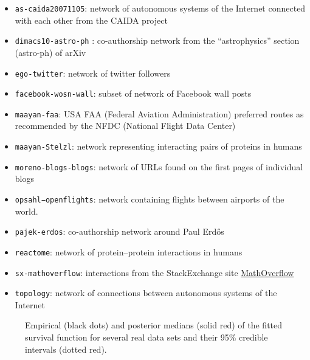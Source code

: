 \documentclass[
  sn-basic,
]{sn-jnl}
\providecommand{\tightlist}{%
  \setlength{\itemsep}{0pt}\setlength{\parskip}{0pt}}
\theoremstyle{plain}
\theoremstyle{plain}
\theoremstyle{remark}
\begin{document}
\begin{itemize}
\tightlist
\item
  \texttt{as-caida20071105}: network of autonomous systems of the
  Internet connected with each other from the CAIDA project
\item
  \texttt{dimacs10-astro-ph} : co-authorship network from the
  ``astrophysics'' section (astro-ph) of arXiv
\item
  \texttt{ego-twitter}: network of twitter followers
\item
  \texttt{facebook-wosn-wall}: subset of network of Facebook wall posts
\item
  \texttt{maayan-faa}: USA FAA (Federal Aviation Administration)
  preferred routes as recommended by the NFDC (National Flight Data
  Center)
\item
  \texttt{maayan-Stelzl}: network representing interacting pairs of
  proteins in humans
\item
  \texttt{moreno-blogs-blogs}: network of URLs found on the first pages
  of individual blogs
\item
  \texttt{opsahl−openflights}: network containing flights between
  airports of the world.
\item
  \texttt{pajek-erdos}: co-authorship network around Paul Erdős
\item
  \texttt{reactome}: network of protein--protein interactions in humans
\item
  \texttt{sx-mathoverflow}: interactions from the StackExchange site
  \href{https://mathoverflow.net/}{MathOverflow}
\item
  \texttt{topology}: network of connections between autonomous systems
  of the Internet
\end{itemize}

\begin{figure}


\caption{\label{fig-real1}Empirical (black dots) and posterior medians
(solid red) of the fitted survival function for several real data sets
and their 95\% credible intervals (dotted red).}

\end{figure}%
\end{document}
